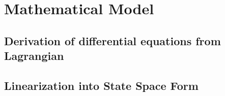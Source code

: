 \section{Mathematical Model}

\subsection{Derivation of differential equations from Lagrangian}
\subsection{Linearization into State Space Form}
